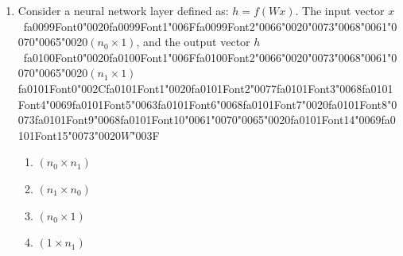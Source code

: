 \documentclass[12pt]{article}
\begin{document}
\begin{enumerate}[label=Q\arabic*.]
\begin{enumerate}[label=(\Alph*)]
    \item All future inputs
\end{enumerate}
\item Consider a neural network layer defined as: $h = f(Wx)$. The input vector $x$\ {\csname fa0099Font0\endcsname\char"0020}{\csname fa0099Font1\endcsname\char"006F}{\csname fa0099Font2\endcsname\char"0066}{\char"0020}{\char"0073}{\char"0068}{\char"0061}{\char"0070}{\char"0065}{\char"0020}$(n_0 \times 1)$, and the output vector $h$\ {\csname fa0100Font0\endcsname\char"0020}{\csname fa0100Font1\endcsname\char"006F}{\csname fa0100Font2\endcsname\char"0066}{\char"0020}{\char"0073}{\char"0068}{\char"0061}{\char"0070}{\char"0065}{\char"0020}$(n_1 \times 1)${\csname fa0101Font0\endcsname\char"002C}{\csname fa0101Font1\endcsname\char"0020}{\csname fa0101Font2\endcsname\char"0077}{\csname fa0101Font3\endcsname\char"0068}{\csname fa0101Font4\endcsname\char"0069}{\csname fa0101Font5\endcsname\char"0063}{\csname fa0101Font6\endcsname\char"0068}{\csname fa0101Font7\endcsname\char"0020}{\csname fa0101Font8\endcsname\char"0073}{\csname fa0101Font9\endcsname\char"0068}{\csname fa0101Font10\endcsname\char"0061}{\char"0070}{\char"0065}{\char"0020}{\csname fa0101Font14\endcsname\char"0069}{\csname fa0101Font15\endcsname\char"0073}{\char"0020}$W${\char"003F}
\begin{enumerate}[label=(\Alph*)]
    \item $(n_0 \times n_1)$
    \item $(n_1 \times n_0)$
    \item $(n_0 \times 1)$
    \item $(1 \times n_1)$
\end{enumerate}

\end{enumerate}
\end{document}
